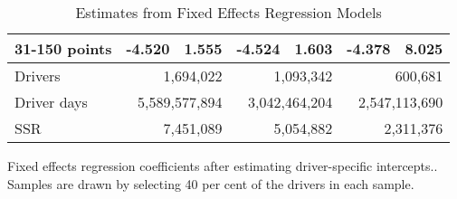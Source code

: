 \begin{table}
\begin{tabular}{l r r r r r r}
31-150 points  & -4.520  &  1.555  & -4.524  &  1.603  & -4.378  &  8.025   \\ 
 

\hline 
 

Drivers 
 & \multicolumn{2}{r}{1,694,022}  & \multicolumn{2}{r}{1,093,342}  & \multicolumn{2}{r}{600,681}   \\ 
 

Driver days 
 & \multicolumn{2}{r}{5,589,577,894}  & \multicolumn{2}{r}{3,042,464,204}  & \multicolumn{2}{r}{2,547,113,690}   \\ 
 

SSR 
 & \multicolumn{2}{r}{7,451,089}  & \multicolumn{2}{r}{5,054,882}  & \multicolumn{2}{r}{2,311,376}   \\ 
 

\hline 
 
\end{tabular} 
\caption{Estimates from Fixed Effects Regression Models} 
Fixed effects regression coefficients after estimating driver-specific intercepts.. 
Samples are drawn by selecting 40 per cent of the drivers in each sample. 
\label{FE_regs} 
\end{table} 
 
